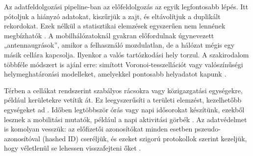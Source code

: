 Az adatfeldolgozási pipeline-ban az előfeldolgozás az egyik legfontosabb lépés. Itt pótoljuk a hiányzó adatokat, kiszűrjük a zajt, és eltávolítjuk a duplikált rekordokat. Ezek nélkül a statisztikai elemzések egyszerűen nem lennének megbízhatók \cite{pinter2020artificial, pinter2022awakening}. A mobilhálózatoknál gyakran előfordulnak úgynevezett „antennaugrások”, amikor a felhasználó mozdulatlan, de a hálózat mégis egy másik cellára kapcsolja. Ilyenkor a valós tartózkodási hely torzul. A szakirodalom többféle módszert is ajánl erre: simított Voronoi-tesszellációt vagy valószínűségi helymeghatározási modelleket, amelyekkel pontosabb helyadatot kapunk \cite{traag2011social}.

Térben a cellákat rendszerint szabályos rácsokra vagy közigazgatási egységekre, például kerületekre vetítik át. Ez leegyszerűsíti a területi elemzést, kezelhetőbb egységeket ad \cite{rhoads2020measuring, pinter2021evaluating}. Időben legtöbbször órás vagy napi idősorokat készítünk, ezekből lesznek a mobilitási mutatók, például a napi aktivitási görbék \cite{pinter2022awakening}. Az adatvédelmet is komolyan vesszük: az előfizetői azonosítókat minden esetben pszeudo-azonosítóval (hashed ID) cseréljük, és ezeket szigorú protokollok szerint kezeljük, hogy véletlenül se lehessen visszafejteni őket \cite{zhang2019connected, pinter2022awakening, batty2012smart}.